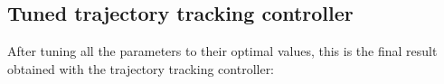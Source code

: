 \documentclass[11pt,a4paper]{article}
\begin{document}
\subsection{Tuned trajectory tracking controller}

After tuning all the parameters to their optimal values, this is the final result obtained with the trajectory
tracking controller:

\begin{figure}[H]
    \centering
    \quad
\end{figure}
\end{document}
